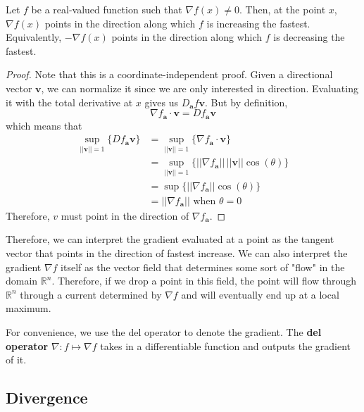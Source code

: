   \begin{theorem}
  Let $f$ be a real-valued function such that $\nabla f(x) \neq 0$. Then, at the point $x$, $\nabla f(x)$ points in the direction along which $f$ is increasing the fastest. Equivalently, $-\nabla f(x)$ points in the direction along which $f$ is decreasing the fastest. 
  \end{theorem}
  \begin{proof}
  Note that this is a coordinate-independent proof. Given a directional vector $\mathbf{v}$, we can normalize it since we are only interested in direction. Evaluating it with the total derivative at $x$ gives us $D_\mathbf{a} f \mathbf{v}$. But by definition, 
  \[\nabla f_\mathbf{a} \cdot \mathbf{v} = D f_\mathbf{a} \mathbf{v}\]
  which means that 
  \begin{align*}
      \sup_{||\mathbf{v}|| = 1} \{D f_\mathbf{a} \mathbf{v}\} & = \sup_{||\mathbf{v}||=1} \{\nabla f_\mathbf{a} \cdot \mathbf{v}\} \\
      & = \sup_{||\mathbf{v}||=1} \{ ||\nabla f_\mathbf{a}|| \, ||\mathbf{v}|| \cos(\theta)\} \\
      & = \sup \{||\nabla f_\mathbf{a}|| \cos(\theta)\} \\
      & = ||\nabla f_\mathbf{a}|| \text{ when } \theta = 0
  \end{align*}
  Therefore, $v$ must point in the direction of $\nabla f_\mathbf{a}$. 
  \end{proof}

  Therefore, we can interpret the gradient evaluated at a point as the tangent vector that points in the direction of fastest increase. We can also interpret the gradient $\nabla f$ itself as the vector field that determines some sort of "flow" in the domain $\mathbb{R}^n$. Therefore, if we drop a point in this field, the point will flow through $\mathbb{R}^n$ through a current determined by $\nabla f$ and will eventually end up at a local maximum. 

  \begin{definition}
  For convenience, we use the del operator to denote the gradient. The \textbf{del operator} $\nabla: f \mapsto \nabla f$ takes in a differentiable function and outputs the gradient of it. 
  \end{definition}

\subsection{Divergence}

